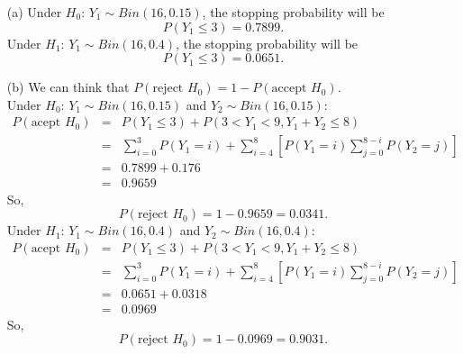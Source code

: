 \documentclass[11pt,a4paper]{article}
\begin{document}
\begin{enumerate}
\item[(a)] Under $H_0$: $Y_1\sim Bin (16,0.15)$, the stopping probability will be $$P(Y_1\leq 3)=0.7899.$$
Under $H_1$: $Y_1\sim Bin (16,0.4)$, the stopping probability will be $$P(Y_1\leq 3)=0.0651.$$
\item[(b)] We can think that $P(\text{reject }H_0)=1-P(\text{accept }H_0)$.\\
Under $H_0$: $Y_1\sim Bin (16,0.15)$ and $Y_2\sim Bin (16,0.15)$:
\begin{eqnarray*}
P(\text{acept }H_0) &=& P(Y_1\leq 3)+P(3<Y_1<9,Y_1+Y_2\leq 8)\\
&=& \sum_{i=0}^{3} P(Y_1=i)+\sum_{i=4}^{8}\left[P(Y_1=i)\sum_{j=0}^{8-i}P(Y_2=j)\right]\\
&=& 0.7899 + 0.176\\
&=& 0.9659
\end{eqnarray*}
So, $$P(\text{reject }H_0)=1-0.9659=0.0341.$$
Under $H_1$: $Y_1\sim Bin (16,0.4)$ and $Y_2\sim Bin (16,0.4)$:
\begin{eqnarray*}
P(\text{acept }H_0) &=& P(Y_1\leq 3)+P(3<Y_1<9,Y_1+Y_2\leq 8)\\
&=& \sum_{i=0}^{3} P(Y_1=i)+\sum_{i=4}^{8}\left[P(Y_1=i)\sum_{j=0}^{8-i}P(Y_2=j)\right]\\
&=& 0.0651+0.0318\\
&=& 0.0969
\end{eqnarray*}
So, $$P(\text{reject }H_0)=1-0.0969=0.9031.$$


\end{enumerate}
\end{document}
